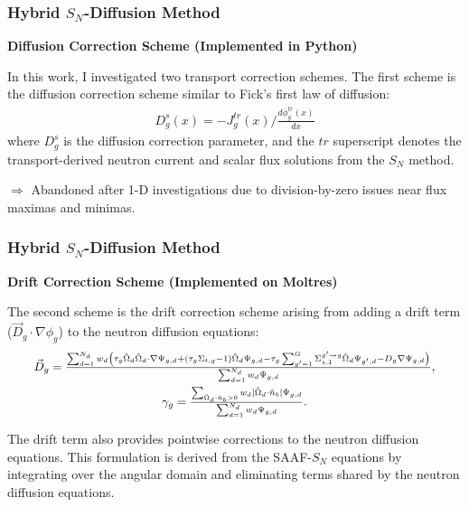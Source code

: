 \begin{frame}
  \frametitle{Hybrid $S_N$-Diffusion Method}
  \textbf{Diffusion Correction Scheme (Implemented in Python)}
  \vspace{.2cm}

  In this work, I investigated two transport correction schemes.
  The first scheme is the diffusion
  correction scheme similar to Fick's first law of diffusion:
  \begin{gather}
    D^s_g(x) = -J^{tr}_g(x)\bigg/\frac{d\phi^{tr}_g(x)}{dx} \label{eq:svdc}
  \end{gather}
  where $D^s_g$ is the diffusion correction parameter, and the $tr$ superscript denotes the
  transport-derived neutron current and scalar flux solutions from the $S_N$ method.
  \vspace{.2cm}


  $\Rightarrow$ Abandoned after 1-D investigations due to division-by-zero issues near flux maximas
  and minimas.
\end{frame}

\begin{frame}
  \frametitle{Hybrid $S_N$-Diffusion Method}
  \textbf{Drift Correction Scheme (Implemented on Moltres)}
  \vspace{.2cm}

  The second scheme is the drift correction scheme arising from adding a drift term
  ($\vec{D}_g\cdot\nabla \phi_g$) \cite{wang_diffusion_2014} to the neutron diffusion equations:
  \begin{gather}
  \scalebox{0.95}{$
    \vec{D}_g = \frac{\sum^{N_d}_{d=1}w_d\left(\tau_g\hat{\Omega}_d\hat{\Omega}_d\cdot\nabla\Psi_{g,d}
    + \left(\tau_g\Sigma_{t,g}-1\right)\hat{\Omega}_d\Psi_{g,d}
    - \tau_g\sum^G_{g'=1}\Sigma^{g'\rightarrow g}_{s,1}\hat{\Omega}_d\Psi_{g',d}
- D_g\nabla\Psi_{g,d}\right)}{\sum^{N_d}_{d=1}w_d\Psi_{g,d}},$} \label{eq:drift} \\
  \scalebox{0.95}{$
    \gamma_g =
    \frac{\sum_{\hat{\Omega}_d\cdot\hat{n}_b > 0}w_d |\hat{\Omega}_d\cdot\hat{n}_b |
  \Psi_{g,d}}{\sum^{N_d}_{d=1}w_d\Psi_{g,d}}.$} \label{eq:bound-coef}
  \end{gather}
  \vspace{.2cm}

  The drift term also provides pointwise corrections to the neutron diffusion equations. This
  formulation is derived from the SAAF-$S_N$ equations by integrating over the angular domain and
  eliminating terms shared by the neutron diffusion equations.
\end{frame}

